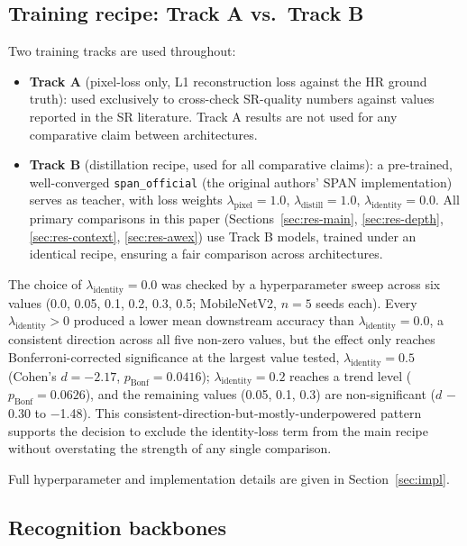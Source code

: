 \documentclass[pdflatex,sn-vancouver-num]{sn-jnl}
\begin{document}
\subsection{Training recipe: Track A vs.\ Track B}
\label{sec:recipe}

Two training tracks are used throughout:

\begin{itemize}
\item \textbf{Track A} (pixel-loss only, L1 reconstruction loss against the HR ground truth): used exclusively to cross-check SR-quality numbers against values reported in the SR literature. Track A results are not used for any comparative claim between architectures.
\item \textbf{Track B} (distillation recipe, used for all comparative claims): a pre-trained, well-converged \texttt{span\_official} (the original authors' SPAN implementation) serves as teacher, with loss weights $\lambda_{\text{pixel}}=1.0$, $\lambda_{\text{distill}}=1.0$, $\lambda_{\text{identity}}=0.0$. All primary comparisons in this paper (Sections~\ref{sec:res-main}, \ref{sec:res-depth}, \ref{sec:res-context}, \ref{sec:res-awex}) use Track B models, trained under an identical recipe, ensuring a fair comparison across architectures.
\end{itemize}

The choice of $\lambda_{\text{identity}}=0.0$ was checked by a hyperparameter sweep across six values (0.0, 0.05, 0.1, 0.2, 0.3, 0.5; MobileNetV2, $n=5$ seeds each). Every $\lambda_{\text{identity}}>0$ produced a lower mean downstream accuracy than $\lambda_{\text{identity}}=0.0$, a consistent direction across all five non-zero values, but the effect only reaches Bonferroni-corrected significance at the largest value tested, $\lambda_{\text{identity}}=0.5$ (Cohen's $d=-2.17$, $p_{\text{Bonf}}=0.0416$); $\lambda_{\text{identity}}=0.2$ reaches a trend level ($p_{\text{Bonf}}=0.0626$), and the remaining values (0.05, 0.1, 0.3) are non-significant ($d$ $-$0.30 to $-$1.48). This consistent-direction-but-mostly-underpowered pattern supports the decision to exclude the identity-loss term from the main recipe without overstating the strength of any single comparison.

Full hyperparameter and implementation details are given in Section~\ref{sec:impl}.

\subsection{Recognition backbones}
\end{document}

